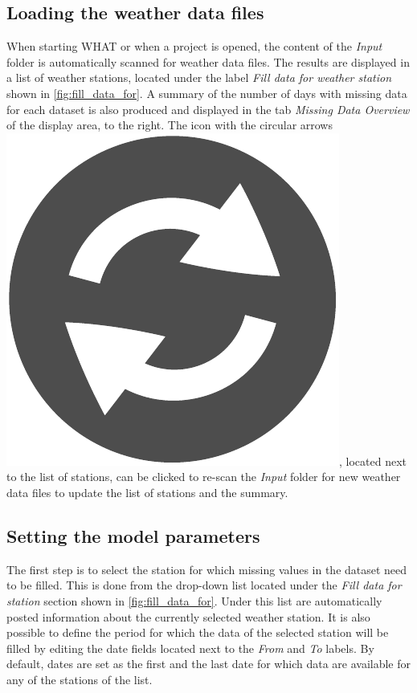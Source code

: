 \documentclass[WHATMANUAL.tex]{subfiles}
\begin{document}
\newpage

\subsection{Loading the weather data files}\label{subsec:creating_list}

When starting WHAT or when a project is opened, the content of the \emph{Input} folder is automatically scanned for weather data files. The results are displayed in a list of weather stations, located under the label \emph{Fill data for weather station} shown in \cref{fig:fill_data_for}. A summary of the number of days with missing data for each dataset is also produced and displayed in the tab \emph{Missing Data Overview} of the display area, to the right. The icon with the circular arrows~{\includegraphics[height=2ex]{img/refresh2}}, located next to the list of stations, can be clicked to re-scan the \emph{Input} folder for new weather data files to update the list of stations and the summary. 

\begin{figure}[!t]
    \setlength{\fboxsep}{0pt}
    {
    }
\end{figure}

\subsection{Setting the model parameters}

The first step is to select the station for which missing values in the dataset need to be filled. This is done from the drop-down list located under the \emph{Fill data for station} section shown in \cref{fig:fill_data_for}. Under this list are automatically posted information about the currently selected weather station. It is also possible to define the period for which the data of the selected station will be filled by editing the date fields located next to the \emph{From} and \emph{To} labels. By default, dates are set as the first and the last date for which data are available for any of the stations of the list.
\end{document}
